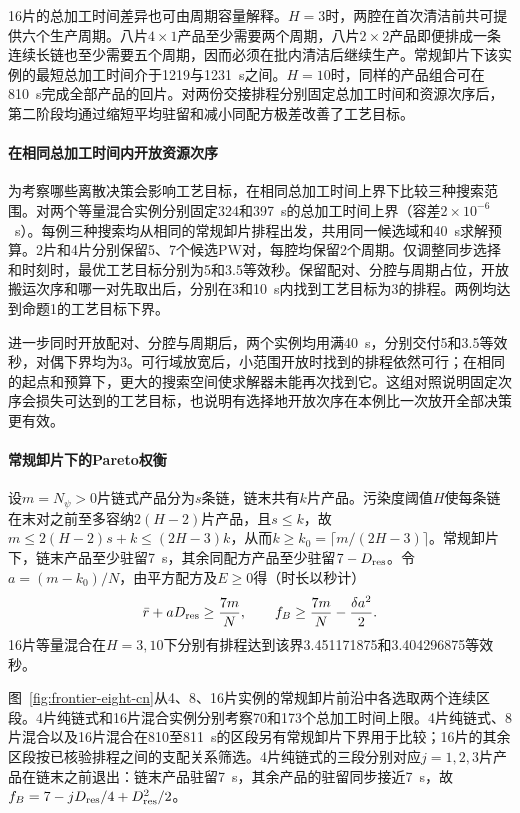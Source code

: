 \documentclass[preprint,12pt,nonatbib]{elsarticle}
\begin{document}
16片的总加工时间差异也可由周期容量解释。$H=3$时，两腔在首次清洁前共可提供六个生产周期。八片$4\times1$产品至少需要两个周期，八片$2\times2$产品即便排成一条连续长链也至少需要五个周期，因而必须在批内清洁后继续生产。常规卸片下该实例的最短总加工时间介于1219与1231~s之间。$H=10$时，同样的产品组合可在810~s完成全部产品的回片。对两份交接排程分别固定总加工时间和资源次序后，第二阶段均通过缩短平均驻留和减小同配方极差改善了工艺目标。

\paragraph{在相同总加工时间内开放资源次序}
为考察哪些离散决策会影响工艺目标，在相同总加工时间上界下比较三种搜索范围。对两个等量混合实例分别固定324和397~s的总加工时间上界（容差$2\times10^{-6}$~s）。每例三种搜索均从相同的常规卸片排程出发，共用同一候选域和40~s求解预算。2片和4片分别保留5、7个候选PW对，每腔均保留2个周期。仅调整同步选择和时刻时，最优工艺目标分别为5和3.5等效秒。保留配对、分腔与周期占位，开放搬运次序和哪一对先取出后，分别在3和10~s内找到工艺目标为3的排程。两例均达到命题1的工艺目标下界。

进一步同时开放配对、分腔与周期后，两个实例均用满40~s，分别交付5和3.5等效秒，对偶下界均为3。可行域放宽后，小范围开放时找到的排程依然可行；在相同的起点和预算下，更大的搜索空间使求解器未能再次找到它。这组对照说明固定次序会损失可达到的工艺目标，也说明有选择地开放次序在本例比一次放开全部决策更有效。

\paragraph{常规卸片下的Pareto权衡}
设$m=N_\psi>0$片链式产品分为$s$条链，链末共有$k$片产品。污染度阈值$H$使每条链在末对之前至多容纳$2(H-2)$片产品，且$s\le k$，故$m\le2(H-2)s+k\le(2H-3)k$，从而$k\ge k_0=\lceil m/(2H-3)\rceil$。常规卸片下，链末产品至少驻留7~s，其余同配方产品至少驻留$7-D_{\rm res}$。令$a=(m-k_0)/N$，由平方配方及$E\ge0$得（时长以秒计）
\[
\bar r+aD_{\rm res}\ge\frac{7m}{N},
\qquad
f_B\ge\frac{7m}{N}-\frac{\delta a^2}{2}.
\]
16片等量混合在$H=3,10$下分别有排程达到该界3.451171875和3.404296875等效秒。

图~\ref{fig:frontier-eight-cn}从4、8、16片实例的常规卸片前沿中各选取两个连续区段。4片纯链式和16片混合实例分别考察70和173个总加工时间上限。4片纯链式、8片混合以及16片混合在810至811~s的区段另有常规卸片下界用于比较；16片的其余区段按已核验排程之间的支配关系筛选。4片纯链式的三段分别对应$j=1,2,3$片产品在链末之前退出：链末产品驻留7~s，其余产品的驻留同步接近7~s，故$f_B=7-jD_{\rm res}/4+D_{\rm res}^2/2$。
\end{document}
